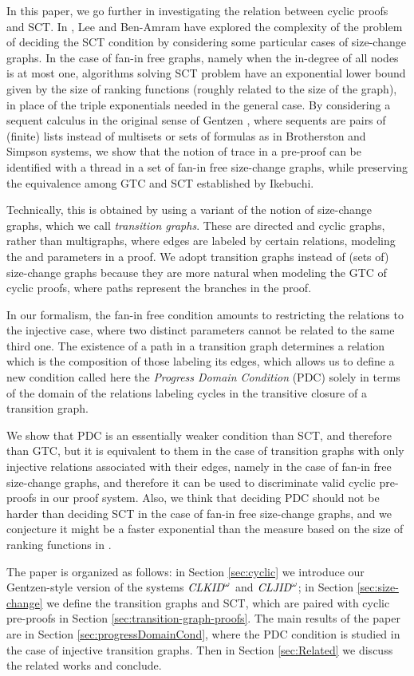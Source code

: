 In this paper, we go further in investigating the relation between cyclic proofs and SCT. 
In \cite{Lee2,Ben-AmramLee2007,Lee3}, Lee and Ben-Amram have explored the complexity of the problem of deciding the SCT condition by
considering some particular cases of size-change graphs. In the case of fan-in free graphs, namely when the in-degree of all nodes is at most one, algorithms solving SCT problem have an exponential lower bound given by the size of ranking functions (roughly related to the size of the graph), in place of the triple exponentials needed in the general case. By considering a sequent calculus in the original sense of Gentzen \cite{Gentzen1969}, where sequents are pairs of (finite) lists instead of multisets or sets of formulas as in Brotherston and Simpson systems, we show that the notion of trace in a pre-proof can be identified with a thread in a set of fan-in free size-change graphs, while preserving the equivalence among GTC and SCT established by Ikebuchi.

Technically, this is obtained by using a variant of the notion of size-change graphs, which we call {\em transition graphs}. These are directed and cyclic graphs, rather than multigraphs, where edges are labeled by certain relations, modeling the  and 
  parameters in a proof. We adopt transition graphs instead of (sets of) size-change graphs because they are more natural when modeling the GTC of cyclic proofs, where paths represent the branches in the proof.

In our formalism, the fan-in free condition amounts to restricting the relations to the injective case, where two distinct parameters cannot be related to the same third one. The existence of a path in a transition graph determines a relation which is the composition of those labeling its edges, which allows us to define a new condition called here the {\em Progress Domain Condition} 
(PDC) solely in terms of the domain of the relations labeling cycles in the transitive closure of a transition graph. 

We show that PDC is an essentially weaker condition than SCT, and therefore than GTC, but it is equivalent to them in the case of transition graphs with only injective relations associated with their edges, namely in the case of fan-in free size-change graphs, and therefore it can be used to discriminate valid cyclic pre-proofs in our proof system. Also, we think that deciding PDC should not be harder than deciding SCT in the case of fan-in free size-change graphs, and we conjecture it might be a faster exponential 
than the measure based on the size of ranking functions in \cite{Lee3}.

\medskip
The paper is organized as follows: in Section \ref{sec:cyclic} we introduce our Gentzen-style version of the systems $\textit{CLKID}^\omega$ and $\textit{CLJID}^\omega$; in Section
\ref{sec:size-change} we define the transition graphs and SCT, which are paired with cyclic pre-proofs in Section \ref{sec:transition-graph-proofs}. The main results of the paper are in Section \ref{sec:progressDomainCond}, where the PDC condition is studied in the case of injective transition graphs. Then in Section \ref{sec:Related} we
discuss the related works and conclude. 
